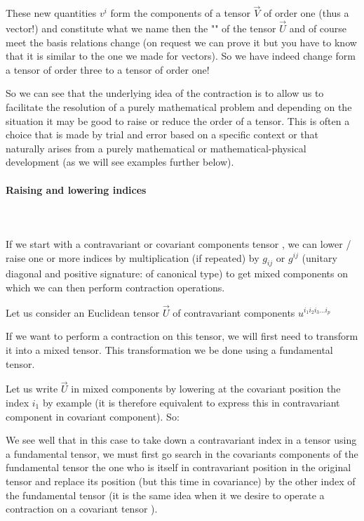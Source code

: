 	These new quantities $v^i$ form the components of a tensor $\vec{V}$ of order one (thus a vector!) and constitute what we name then the "" of the tensor $\vec{U}$ and of course meet the basis relations change (on request we can prove it but you have to know that it is similar to the one we made for vectors). So we have indeed change form a tensor of order three to a tensor of order one!
	
	So we can see that the underlying idea of the contraction is to allow us to facilitate the resolution of a purely mathematical problem and depending on the situation it may be good  to raise or reduce the order of a tensor. This is often a choice that is made by trial and error based on a specific context or that naturally arises from a purely mathematical or mathematical-physical development (as we will see examples further below).

	\paragraph{Raising and lowering indices}\mbox{}\\\\
	If we start with a contravariant or covariant components tensor , we can lower / raise one or more indices by multiplication (if repeated) by $g_{ij}$ or $g^{ij}$ (unitary diagonal and positive signature: of canonical type) to get mixed components on which we can then perform contraction operations.
	
	Let us consider an Euclidean tensor $\vec{U}$ of contravariant components $u^{i_1i_2i_3\ldots i_p}$

	If we want to perform a contraction on this tensor, we will first need to transform it into a mixed tensor. This transformation we be done using a fundamental tensor.

	Let us write $\vec{U}$ in mixed components by lowering at the covariant position the index $i_1$ by example (it is therefore equivalent to express this in contravariant component in covariant component). So:
	
	We see well that in this case to take down a contravariant index in a tensor using a fundamental tensor, we must first go search in the covariants components of the fundamental tensor the one who is itself in contravariant position in the original tensor and replace its position (but this time in covariance) by the other index of the fundamental tensor (it is the same idea when it we desire to operate a contraction on a covariant tensor ).
	
